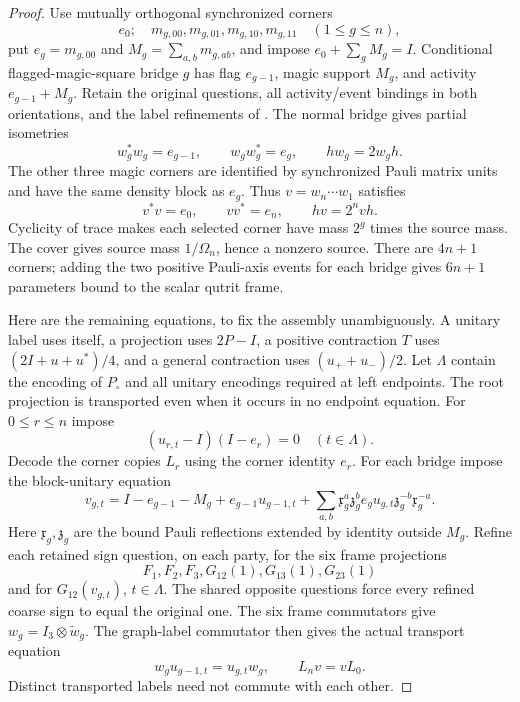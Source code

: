 \begin{proof}
Use mutually orthogonal synchronized corners
\[
 e_0;\quad m_{g,00},m_{g,01},m_{g,10},m_{g,11}\quad(1\leq g\leq n),
\]
put $e_g=m_{g,00}$ and $M_g=\sum_{a,b}m_{g,ab}$, and impose $e_0+\sum_gM_g=I$. Conditional flagged-magic-square bridge $g$ has flag $e_{g-1}$, magic support $M_g$, and activity $e_{g-1}+M_g$. Retain the original questions, all activity/event bindings in both orientations, and the label refinements of \cite[Lemmas~4.1--4.2]{Sigma2}. The normal bridge gives partial isometries
\[
 w_g^*w_g=e_{g-1},\qquad w_gw_g^*=e_g,\qquad hw_g=2w_gh.
\]
The other three magic corners are identified by synchronized Pauli matrix units and have the same density block as $e_g$. Thus $v=w_n\cdots w_1$ satisfies
\[
 v^*v=e_0,\qquad vv^*=e_n,\qquad hv=2^n vh.
\]
Cyclicity of trace makes each selected corner have mass $2^g$ times the source mass. The cover gives source mass $1/\Omega_n$, hence a nonzero source. There are $4n+1$ corners; adding the two positive Pauli-axis events for each bridge gives $6n+1$ parameters bound to the scalar qutrit frame.

Here are the remaining equations, to fix the assembly unambiguously. A unitary label uses itself, a projection uses $2P-I$, a positive contraction $T$ uses $(2I+u+u^*)/4$, and a general contraction uses $(u_++u_-)/2$. Let $\Lambda$ contain the encoding of $P_\circ$ and all unitary encodings required at left endpoints. The root projection is transported even when it occurs in no endpoint equation. For $0\leq r\leq n$ impose
\[
 (u_{r,t}-I)(I-e_r)=0\quad(t\in\Lambda).
\]
Decode the corner copies $L_r$ using the corner identity $e_r$. For each bridge impose the block-unitary equation
\begin{equation}\label{eq:blockunitary}
 v_{g,t}=I-e_{g-1}-M_g+e_{g-1}u_{g-1,t}
 +\sum_{a,b}\mathfrak x_g^a\mathfrak z_g^be_gu_{g,t}\mathfrak z_g^{-b}\mathfrak x_g^{-a}.
\end{equation}
Here $\mathfrak x_g,\mathfrak z_g$ are the bound Pauli reflections extended by identity outside $M_g$. Refine each retained sign question, on each party, for the six frame projections
\[
 F_1,F_2,F_3,G_{12}(1),G_{13}(1),G_{23}(1)
\]
and for $G_{12}(v_{g,t})$, $t\in\Lambda$. The shared opposite questions force every refined coarse sign to equal the original one. The six frame commutators give $w_g=I_3\otimes\widetilde w_g$. The graph-label commutator then gives the actual transport equation
\[
 w_gu_{g-1,t}=u_{g,t}w_g,\qquad L_nv=vL_0.
\]
Distinct transported labels need not commute with each other.


\end{proof}
